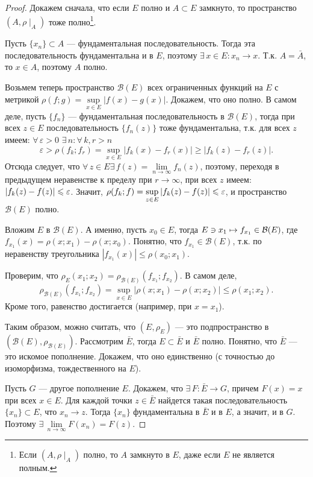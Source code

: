 \documentclass[12pt,titlepage, a4paper]{article}
\begin{document}
\begin{proof}
Докажем сначала, что если $E$ полно и $A\subset E$ замкнуто, то
пространство $(A,\rho\mid_A)$ тоже полно\footnote{Если
$(A,\rho\mid_A)$ полно, то $A$ замкнуто в $E$, даже если $E$ не
является полным.}.

Пусть $\{x_n\}\subset A$ --- фундаментальная последовательность.
Тогда эта последовательность фундаментальна и в $E$, поэтому
$\exists\, x\in E:x_n\to x$. Т.к. $A=\bar{A}$, то $x\in A$, поэтому
$A$ полно.

Возьмем теперь пространство $\mathcal{B}(E)$ всех ограниченных
функций на $E$ с метрикой $\rho(f;g)=\sup\limits_{x\in
E}|f(x)-g(x)|$. Докажем, что оно полно. В самом деле, пусть
$\{f_n\}$ --- фундаментальная последовательность в $\mathcal{B}(E)$,
тогда при всех $z\in E$ последовательность $\{f_n(z)\}$ тоже
фундаментальна, т.к. для всех $z$ имеем: $\forall\,\varepsilon>0$\;
$\exists\,n:\forall\,k,r>n$
$$\varepsilon>\rho(f_k;f_r)=\sup\limits_{x\in
E}|f_k(x)-f_r(x)|\geqslant|f_k(z)-f_r(z)|.$$ Отсюда следует, что
$\forall\,z\in E$\;\;$\exists\,f(z)=\lim\limits_{n\to\infty}f_n(z)$,
поэтому, переходя в предыдущем неравенстве к пределу при
$r\to\infty$, при всех $z$ имеем:
$|f_k(z)\p-f(z)|\leqslant\varepsilon$. Значит,
$\rho(f_k;f)\p=\sup\limits_{z\in
E}|f_k(z)-f(z)|\leqslant\varepsilon$, и пространство
$\mathcal{B}(E)$ полно.

Вложим $E$ в $\mathcal{B}(E)$. А именно, пусть $x_0\in E$, тогда
$E\ni x_1\mapsto f_{x_1}\p\in\mathcal{B}(E)$, где
$f_{x_1}(x)=\rho(x;x_1)-\rho(x;x_0)$. Понятно, что
$f_{x_1}\in\mathcal{B}(E)$, т.к. по неравенству треугольника
$|f_{x_1}(x)|\leqslant\rho(x_0;x_1)$.

Проверим, что
$\rho_E(x_1;x_2)=\rho_{\mathcal{B}(E)}(f_{x_1};f_{x_2})$. В самом
деле, $$\rho_{\mathcal{B}(E)}(f_{x_1};f_{x_2})=\sup\limits_{x\in
E}|\rho(x;x_1)-\rho(x;x_2)|\leqslant\rho(x_1;x_2).$$ Кроме того,
равенство достигается (например, при $x=x_1$).

Таким образом, можно считать, что $(E,\rho_E)$ --- это
подпространство в $(\mathcal{B}(E), \rho_{\mathcal{B}(E)})$.
Рассмотрим $\bar{E}$, тогда $E\subset \bar{E}$ и $\bar{E}$ полно.
Понятно, что $\bar{E}$
--- это искомое пополнение. Докажем, что оно единственно (с точностью
до изоморфизма, тождественного на $E$).

Пусть $G$ --- другое пополнение $E$. Докажем, что $\exists\, F\colon
\bar{E}\to G$, причем $F(x)=x$ при всех $x\in E$. Для каждой точки
$z\in\bar{E}$ найдется такая последовательность $\{x_n\}\subset E$,
что $x_n\to z$. Тогда $\{x_n\}$ фундаментальна в $\bar{E}$ и в $E$,
а значит, и в $G$. Поэтому
$\exists\,\lim\limits_{n\to\infty}F(x_n)=F(z)$.


\end{proof}
\end{document}
